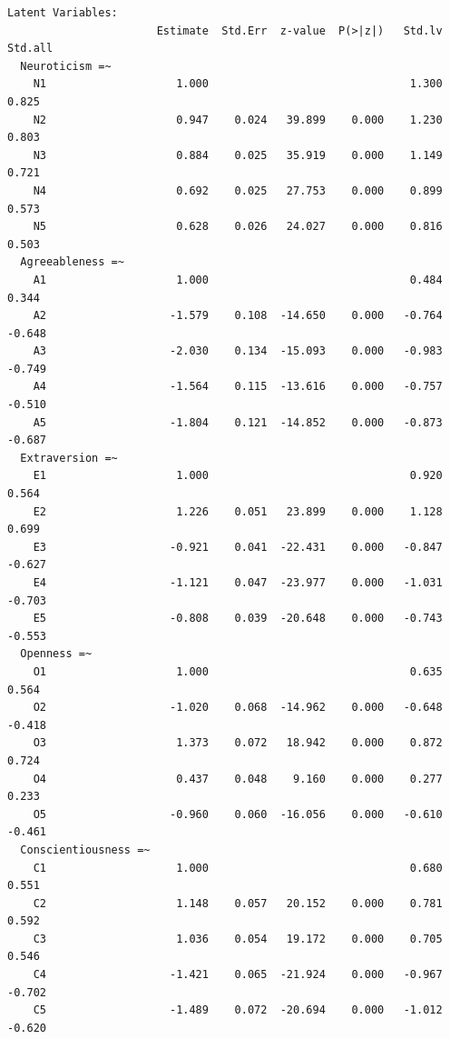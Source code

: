 \documentclass[
  a4paper,
]{ltjsbook}
\begin{document}
\begin{verbatim}
Latent Variables:
                       Estimate  Std.Err  z-value  P(>|z|)   Std.lv  Std.all
  Neuroticism =~                                                            
    N1                    1.000                               1.300    0.825
    N2                    0.947    0.024   39.899    0.000    1.230    0.803
    N3                    0.884    0.025   35.919    0.000    1.149    0.721
    N4                    0.692    0.025   27.753    0.000    0.899    0.573
    N5                    0.628    0.026   24.027    0.000    0.816    0.503
  Agreeableness =~                                                          
    A1                    1.000                               0.484    0.344
    A2                   -1.579    0.108  -14.650    0.000   -0.764   -0.648
    A3                   -2.030    0.134  -15.093    0.000   -0.983   -0.749
    A4                   -1.564    0.115  -13.616    0.000   -0.757   -0.510
    A5                   -1.804    0.121  -14.852    0.000   -0.873   -0.687
  Extraversion =~                                                           
    E1                    1.000                               0.920    0.564
    E2                    1.226    0.051   23.899    0.000    1.128    0.699
    E3                   -0.921    0.041  -22.431    0.000   -0.847   -0.627
    E4                   -1.121    0.047  -23.977    0.000   -1.031   -0.703
    E5                   -0.808    0.039  -20.648    0.000   -0.743   -0.553
  Openness =~                                                               
    O1                    1.000                               0.635    0.564
    O2                   -1.020    0.068  -14.962    0.000   -0.648   -0.418
    O3                    1.373    0.072   18.942    0.000    0.872    0.724
    O4                    0.437    0.048    9.160    0.000    0.277    0.233
    O5                   -0.960    0.060  -16.056    0.000   -0.610   -0.461
  Conscientiousness =~                                                      
    C1                    1.000                               0.680    0.551
    C2                    1.148    0.057   20.152    0.000    0.781    0.592
    C3                    1.036    0.054   19.172    0.000    0.705    0.546
    C4                   -1.421    0.065  -21.924    0.000   -0.967   -0.702
    C5                   -1.489    0.072  -20.694    0.000   -1.012   -0.620


\end{verbatim}
\end{document}
